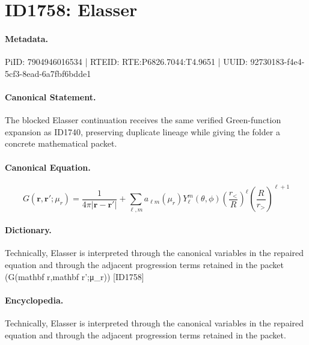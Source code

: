 \section*{ID1758: Elasser}
\paragraph{Metadata.}
PiID: 7904946016534 | RTEID: RTE:P6826.7044:T4.9651 | UUID: 92730183-f4e4-5cf3-8ead-6a7fbf6bdde1

\paragraph{Canonical Statement.}
The blocked Elasser continuation receives the same verified Green-function expansion as ID1740, preserving duplicate lineage while giving the folder a concrete mathematical packet.

\paragraph{Canonical Equation.}
\[
G(\mathbf r,\mathbf r';\mu_r)=\frac{1}{4\pi\lvert\mathbf r-\mathbf r'\rvert}+\sum_{\ell,m}a_{\ell m}(\mu_r)Y_{\ell}^{m}(\theta,\phi)\left(\frac{r_{<}}{R}\right)^{\ell}\left(\frac{R}{r_{>}}\right)^{\ell+1}
\]

\paragraph{Dictionary.}
Technically, Elasser is interpreted through the canonical variables in the repaired equation and through the adjacent progression terms retained in the packet (G(mathbf r,mathbf r';μ\_r)) [ID1758]

\paragraph{Encyclopedia.}
Technically, Elasser is interpreted through the canonical variables in the repaired equation and through the adjacent progression terms retained in the packet.
